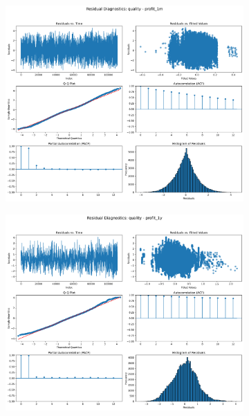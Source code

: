 \documentclass[11pt,english,a4paper,hidelinks]{book}
\begin{document}
\begin{figure}[H]
    \centering
    \begin{subfigure}[b]{0.32\textwidth}
        \centering
        \includegraphics[width=\textwidth]{images/code/models/linear_regression/first_model/IF HARD Balanced/quality_profit_1m_residuals - Gaussian.png}
    \end{subfigure}
    \hfill
    \begin{subfigure}[b]{0.32\textwidth}
        \centering
        \includegraphics[width=\textwidth]{images/code/models/linear_regression/first_model/IF HARD Balanced/quality_profit_1y_residuals - Gaussian.png}

\end{subfigure}
\end{figure}
\end{document}
